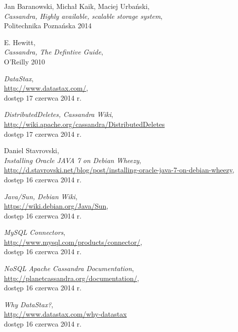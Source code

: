 \documentclass{article} %
\begin{document}
\begin{thebibliography}{10}%

Jan Baranowski, Michał Kaik, Maciej Urbański,\\
\emph{Cassandra, Highly available, scalable storage system},\\
Politechnika Poznańska 2014

E. Hewitt,\\
\emph{Cassandra, The Defintive Guide},\\
O'Reilly 2010

\emph{DataStax},\\
\url{http://www.datastax.com/},\\
dostęp 17 czerwca 2014 r.

\emph{DistributedDeletes, Cassandra Wiki},\\
\url{http://wiki.apache.org/cassandra/DistributedDeletes}\\
dostęp 17 czerwca 2014 r.

Daniel Stavrovski,\\
\emph{Installing Oracle JAVA 7 on Debian Wheezy},\\
\url{http://d.stavrovski.net/blog/post/installing-oracle-java-7-on-debian-wheezy},\\
dostęp 16 czerwca 2014 r.

\emph{Java/Sun, Debian Wiki},\\
\url{https://wiki.debian.org/Java/Sun},\\
dostęp 16 czerwca 2014 r.

\emph{MySQL Connectors},\\
\url{http://www.mysql.com/products/connector/},\\
dostęp 16 czerwca 2014 r.

\emph{NoSQL Apache Cassandra Documentation},\\
\url{http://planetcassandra.org/documentation/},\\
dostęp 16 czerwca 2014 r.

\emph{Why DataStax?},\\
\url{http://www.datastax.com/why-datastax}\\
dostęp 16 czerwca 2014 r.

\end{thebibliography}
\end{document}
